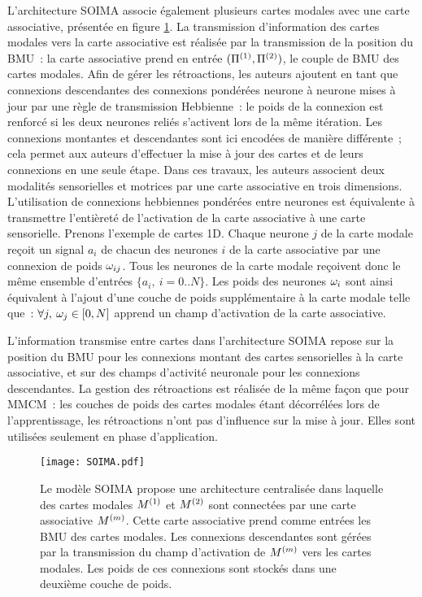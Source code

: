 \documentclass[../main]{subfiles}
\begin{document}
L'architecture SOIMA \parencite{escobar-juarez_self-organized_2016} associe également plusieurs cartes modales avec une carte associative, présentée en figure \ref{fig:SOIMA}.
La transmission d'information des cartes modales vers la carte associative est réalisée par la transmission de la position du BMU~: la carte associative prend en entrée $(\Pi^{({1})},\Pi^{({2})})$, le couple de BMU des cartes modales. 
Afin de gérer les rétroactions, les auteurs ajoutent en tant que connexions descendantes des connexions pondérées neurone à neurone mises à jour par une règle de transmission Hebbienne~: le poids de la connexion est renforcé si les deux neurones reliés s'activent lors de la même itération.
Les connexions montantes et descendantes sont ici encodées de manière différente~; cela permet aux auteurs d'effectuer la mise à jour des cartes et de leurs connexions en une seule étape. 
Dans ces travaux, les auteurs associent deux modalités sensorielles et motrices par une carte associative en trois dimensions.
L'utilisation de connexions hebbiennes pondérées entre neurones est équivalente à transmettre l'entièreté de l'activation de la carte associative à une carte sensorielle.
Prenons l'exemple de cartes 1D. Chaque neurone $j$ de la carte modale reçoit un signal $a_{i}$ de chacun des neurones $i$ de la carte associative par une connexion de poids $\omega_{ij}$. Tous les neurones de la carte modale reçoivent donc le même ensemble d'entrées $ \{a_{i},\: i = 0 .. N\}$.
Les poids des neurones $\omega_i$ sont ainsi équivalent à l'ajout d'une couche de poids supplémentaire à la carte modale telle que~: $\forall j, \: \omega_j \in [0,N]$ apprend un champ d'activation de la carte associative.

L'information transmise entre cartes dans l'architecture SOIMA repose sur la position du BMU pour les connexions montant des cartes sensorielles à la carte associative, et sur des champs d'activité neuronale pour les connexions descendantes.
La gestion des rétroactions est réalisée de la même façon que pour MMCM~: les couches de poids des cartes modales étant décorrélées lors de l'apprentissage, les rétroactions n'ont pas d'influence sur la mise à jour. Elles sont utilisées seulement en phase d'application.

\begin{figure}[t]
    \centering
    \texttt{[image: SOIMA.pdf]}
    \caption{Le modèle SOIMA \parencite{escobar-juarez_self-organized_2016} propose une architecture centralisée dans laquelle des cartes modales $M^{({1})}$ et $M^{({2})}$ sont connectées par une carte associative $M^{({m})}$. Cette carte associative prend comme entrées les BMU des cartes modales. 
    Les connexions descendantes sont gérées par la transmission du champ d'activation de $M^{({m})}$ vers les cartes modales. Les poids de ces connexions sont stockés dans une deuxième couche de poids.
    \label{fig:SOIMA}}
\end{figure}
\end{document}
